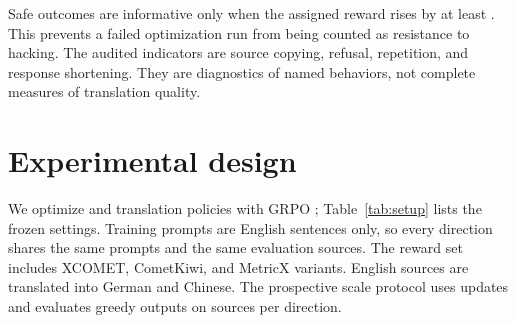 \documentclass[11pt]{article}
\begin{document}
Safe outcomes are informative only when the assigned reward rises by at least
\ManipulationThreshold{}.  This prevents a failed optimization run from being
counted as resistance to hacking.  The audited indicators are source copying,
refusal, repetition, and response shortening.  They are diagnostics of named
behaviors, not complete measures of translation quality.

\section{Experimental design}

\begin{table}[t]
\centering
\small
{}
\caption{Frozen training and audit settings, read from the protocol files.}
\label{tab:setup}
\end{table}

We optimize \SmallPolicy{} and \LargePolicy{} translation policies with GRPO
\citep{shao-etal-2024-deepseekmath}; Table~\ref{tab:setup} lists the frozen
settings.  Training prompts are English sentences only, so every direction
shares the same prompts and the same evaluation sources.  The reward set includes XCOMET,
CometKiwi, and MetricX variants.  English sources are translated into German
and Chinese.  The prospective scale protocol uses \TrainingSteps{} updates and
evaluates greedy outputs on \EvalSources{} sources per direction.
\end{document}
